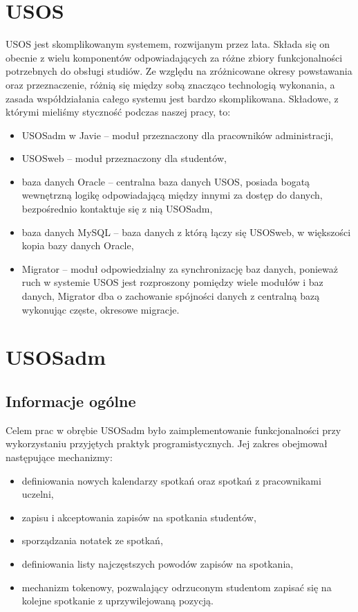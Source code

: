 \documentclass[licencjacka]{pracamgr}
\begin{document}
\section{USOS}
USOS jest skomplikowanym systemem, rozwijanym przez lata. Składa się on obecnie z wielu komponentów odpowiadających za różne zbiory funkcjonalności potrzebnych do obsługi studiów. Ze względu na zróżnicowane okresy powstawania oraz przeznaczenie, różnią się między sobą znacząco technologią wykonania, a zasada współdziałania całego systemu jest bardzo skomplikowana.
Składowe, z którymi mieliśmy styczność podczas naszej pracy, to:
\begin{itemize}
\item USOSadm w Javie -- moduł przeznaczony dla pracowników administracji,
\item USOSweb -- moduł przeznaczony dla studentów,
\item baza danych Oracle -- centralna baza danych USOS, posiada bogatą wewnętrzną logikę odpowiadającą między innymi za dostęp do danych, bezpośrednio kontaktuje się z nią USOSadm,
\item baza danych MySQL -- baza danych z którą łączy się USOSweb, w większości kopia bazy danych Oracle,
\item Migrator -- moduł odpowiedzialny za synchronizację baz danych, ponieważ ruch w systemie USOS jest rozproszony pomiędzy wiele modułów i baz danych, Migrator dba o zachowanie spójności danych z centralną bazą wykonując częste, okresowe migracje.
\end{itemize}

\section{USOSadm} \label{sec:impusos}

\subsection{Informacje ogólne}
Celem prac w obrębie USOSadm było zaimplementowanie funkcjonalności przy wykorzystaniu przyjętych praktyk programistycznych. Jej zakres obejmował następujące mechanizmy:
\begin{itemize}
\item definiowania nowych kalendarzy spotkań oraz spotkań z pracownikami uczelni,
\item zapisu i akceptowania zapisów na spotkania studentów,
\item sporządzania notatek ze spotkań,
\item definiowania listy najczęstszych powodów zapisów na spotkania,
\item mechanizm tokenowy, pozwalający odrzuconym studentom zapisać się na kolejne spotkanie z uprzywilejowaną pozycją.
\end{itemize}
\end{document}
